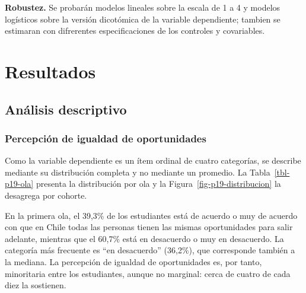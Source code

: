 \documentclass[
  spanish,
  a4paper,
  oneside]{scrbook}
\begin{document}
\textbf{Robustez.} Se probarán modelos lineales sobre la escala de 1 a 4
y modelos logísticos sobre la versión dicotómica de la variable
dependiente; tambien se estimaran con difrerentes especificaciones de
los controles y covariables.


\chapter{Resultados}\label{resultados}

\section{Análisis descriptivo}\label{anuxe1lisis-descriptivo}

\subsection{Percepción de igualdad de
oportunidades}\label{percepciuxf3n-de-igualdad-de-oportunidades}

Como la variable dependiente es un ítem ordinal de cuatro categorías, se
describe mediante su distribución completa y no mediante un promedio. La
Tabla~\ref{tbl-p19-ola} presenta la distribución por ola y la
Figura~\ref{fig-p19-distribucion} la desagrega por cohorte.

En la primera ola, el 39,3\% de los estudiantes está de acuerdo o muy de
acuerdo con que en Chile todas las personas tienen las mismas
oportunidades para salir adelante, mientras que el 60,7\% está en
desacuerdo o muy en desacuerdo. La categoría más frecuente es ``en
desacuerdo'' (36,2\%), que corresponde también a la mediana. La
percepción de igualdad de oportunidades es, por tanto, minoritaria entre
los estudiantes, aunque no marginal: cerca de cuatro de cada diez la
sostienen.
\end{document}

